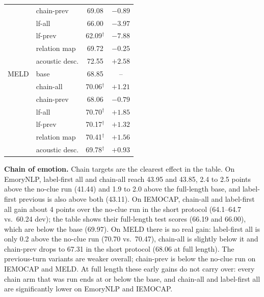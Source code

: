 \documentclass[lettersize,journal]{IEEEtran}
\begin{document}
\begin{table}[!t]
\begin{tabular}{llcc}
 & chain-prev & 69.08 & $-0.89$\\
 & lf-all & 66.00 & $-3.97$\\
 & lf-prev & 62.09$^{\dagger}$ & $-7.88$\\
 & relation map & 69.72 & $-0.25$\\
 & acoustic desc. & 72.55 & $+2.58$\\
\midrule
MELD & base & 68.85 & --\\
 & chain-all & 70.06$^{\dagger}$ & $+1.21$\\
 & chain-prev & 68.06 & $-0.79$\\
 & lf-all & 70.70$^{\dagger}$ & $+1.85$\\
 & lf-prev & 70.17$^{\dagger}$ & $+1.32$\\
 & relation map & 70.41$^{\dagger}$ & $+1.56$\\
 & acoustic desc. & 69.78$^{\dagger}$ & $+0.93$\\
\bottomrule
\end{tabular}
\end{table}

\textbf{Chain of emotion.} Chain targets are the clearest effect in the table. On EmoryNLP, label-first all and chain-all reach 43.95 and 43.85, 2.4 to 2.5 points above the no-clue run (41.44) and 1.9 to 2.0 above the full-length base, and label-first previous is also above both (43.11). On IEMOCAP, chain-all and label-first all gain about 4 points over the no-clue run in the short protocol (64.1--64.7 vs.\ 60.24 dev); the table shows their full-length test scores (66.19 and 66.00), which are below the base (69.97). On MELD there is no real gain: label-first all is only 0.2 above the no-clue run (70.70 vs.\ 70.47), chain-all is slightly below it and chain-prev drops to 67.31 in the short protocol (68.06 at full length). The previous-turn variants are weaker overall; chain-prev is below the no-clue run on IEMOCAP and MELD. At full length these early gains do not carry over: every chain arm that was run ends at or below the base, and chain-all and label-first all are significantly lower on EmoryNLP and IEMOCAP.
\end{document}
